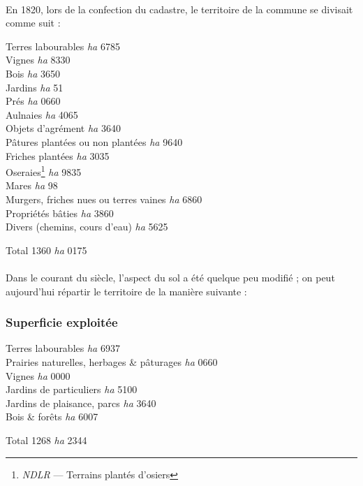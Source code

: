 \documentclass[../eBook.tex]{subfiles}
\begin{document}
    \paragraph{}En 1820, lors de la confection du cadastre, le territoire de la commune se divisait comme suit :
    \begin{center}
      Terres labourables \textit{ha} 6785\\
      Vignes \textit{ha} 8330\\
      Bois \textit{ha} 3650\\
      Jardins \textit{ha} 51~~~~\\
      Prés \textit{ha} 0660\\
      Aulnaies \textit{ha} 4065\\
      Objets d'agrément \textit{ha} 3640\\
      Pâtures plantées ou non plantées \textit{ha} 9640\\
      Friches plantées \textit{ha} 3035\\
      Oseraies\footnote{\textit{NDLR} --- Terrains plantés d'osiers} \textit{ha} 9835\\
      Mares \textit{ha} 98~~~~\\
      Murgers, friches nues ou terres vaines \textit{ha} 6860\\
      Propriétés bâties \textit{ha} 3860\\
      Divers (chemins, cours d'eau) \textit{ha} 5625
    \end{center}
    \hfill Total\makebox[2cm]{\dotfill} 1360 \textit{ha} 0175
    \paragraph{}Dans le courant du siècle, l'aspect du sol a été quelque peu modifié ; on peut aujourd'hui répartir le territoire de la manière suivante :

    \subsubsection*{Superficie exploitée}
      \begin{center}
        Terres labourables \textit{ha} 6937\\
        Prairies naturelles, herbages \& pâturages \textit{ha} 0660\\
        Vignes \textit{ha} 0000\\
        Jardins de particuliers \textit{ha} 5100\\
        Jardins de plaisance, parcs \textit{ha} 3640\\
        Bois \& forêts \textit{ha} 6007\\
      \end{center}
      \hfill Total\makebox[2cm]{\dotfill} 1268 \textit{ha} 2344
\end{document}

